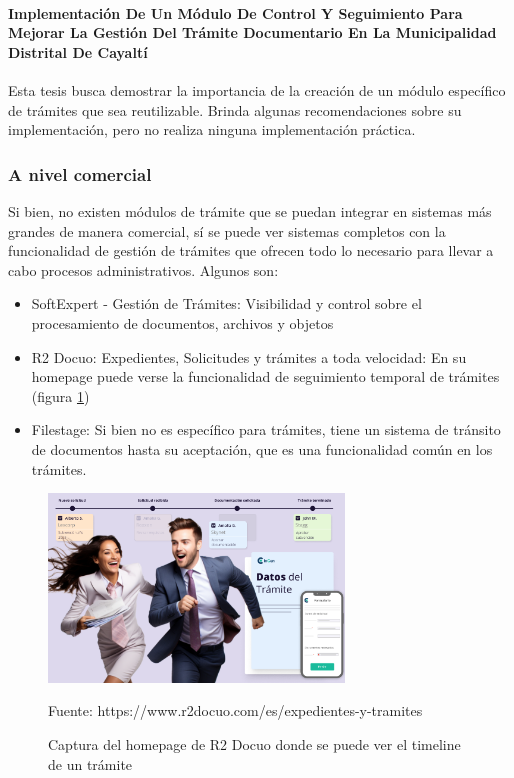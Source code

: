 \paragraph{Implementación De Un Módulo De Control Y Seguimiento Para Mejorar La Gestión Del Trámite Documentario En La Municipalidad Distrital De Cayaltí}

Esta tesis busca demostrar la importancia de la creación de un módulo específico de trámites que sea reutilizable. Brinda algunas recomendaciones sobre su implementación, pero no realiza ninguna implementación práctica.

\subsubsection{A nivel comercial}

Si bien, no existen módulos de trámite que se puedan integrar en sistemas más grandes de manera comercial, sí se puede ver sistemas completos con la funcionalidad de gestión de trámites que ofrecen todo lo necesario para llevar a cabo procesos administrativos. Algunos son:

\begin{itemize}
    \item SoftExpert - Gestión de Trámites: Visibilidad y control sobre el procesamiento de documentos, archivos y objetos
    \item R2 Docuo: Expedientes, Solicitudes y trámites a toda velocidad: En su homepage puede verse la funcionalidad de seguimiento temporal de trámites (figura \ref{fig:r2docuotimeline})
    \item Filestage: Si bien no es específico para trámites, tiene un sistema de tránsito de documentos hasta su aceptación, que es una funcionalidad común en los trámites.
\end{itemize}

\begin{figure}[!htpb]
    \centering
    \includegraphics[width=0.7\textwidth]{assets/r2docuotimeline}
    \caption{Captura del homepage de R2 Docuo donde se puede ver el timeline de un trámite}{Fuente: https://www.r2docuo.com/es/expedientes-y-tramites}
    \label{fig:r2docuotimeline}
\end{figure}

